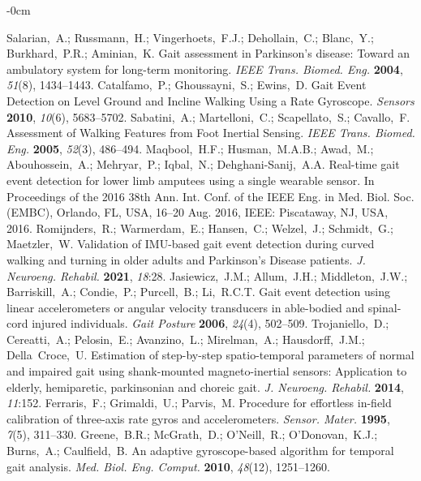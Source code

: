 \documentclass[sensors,article,submit,pdftex,moreauthors]{Definitions/mdpi}
\begin{document}
\begin{adjustwidth}{-\extralength}{0cm}
\begin{thebibliography}{999}
	Salarian,~A.; Russmann,~H.; Vingerhoets,~F.J.; Dehollain,~C.; Blanc,~Y.; Burkhard,~P.R.; Aminian,~K. Gait assessment in Parkinson's
	disease: Toward an ambulatory system for long-term monitoring. {\em IEEE Trans. Biomed. Eng.} {\bf 2004}, {\em 51}(8), 1434--1443. 
	Catalfamo,~P.; Ghoussayni,~S.; Ewins,~D. Gait Event Detection on Level Ground and Incline Walking Using a Rate Gyroscope. {\em Sensors} {\bf 2010}, {\em 10}(6), 5683--5702. 
	Sabatini,~A.; Martelloni,~C.; Scapellato,~S.; Cavallo,~F. Assessment of Walking Features from Foot Inertial Sensing. {\em IEEE Trans. Biomed. Eng.} {\bf 2005}, {\em 52}(3), 486--494.
	Maqbool,~H.F.; Husman,~M.A.B.; Awad,~M.; Abouhossein,~A.; Mehryar,~P.; Iqbal,~N.; Dehghani-Sanij,~A.A. Real-time gait event detection for lower limb amputees using a single wearable sensor. In Proceedings of the 2016 38th Ann. Int. Conf. of the IEEE Eng. in Med. Biol. Soc. (EMBC), Orlando, FL, USA, 16--20 Aug. 2016, IEEE: Piscataway, NJ, USA, 2016. 
	Romijnders,~R.; Warmerdam,~E.; Hansen,~C.; Welzel,~J.; Schmidt,~G.; Maetzler,~W. Validation of IMU-based gait event detection during curved walking and turning in older adults and Parkinson's Disease patients. {\em J. Neuroeng. Rehabil.} {\bf 2021}, {\em 18}:28.
	Jasiewicz,~J.M.; Allum,~J.H.; Middleton,~J.W.; Barriskill,~A.; Condie,~P.; Purcell,~B.; Li,~R.C.T. Gait event detection using linear accelerometers or angular velocity transducers in able-bodied and spinal-cord injured individuals. {\em Gait Posture} {\bf 2006}, {\em 24}(4), 502--509.
	Trojaniello,~D.; Cereatti,~A.; Pelosin,~E.; Avanzino,~L.; Mirelman,~A.; Hausdorff,~J.M.; Della~Croce,~U. Estimation of step-by-step spatio-temporal parameters of normal and impaired gait using shank-mounted magneto-inertial sensors: Application to elderly, hemiparetic, parkinsonian and choreic gait. {\em J. Neuroeng. Rehabil.} {\bf 2014}, {\em 11}:152.
	Ferraris,~F.; Grimaldi,~U.; Parvis,~M. Procedure for effortless in-field calibration of three-axis rate gyros and accelerometers. {\em Sensor. Mater.} {\bf 1995}, {\em 7}(5), 311--330.
	Greene,~B.R.; McGrath,~D.; O'Neill,~R.; O'Donovan,~K.J.; Burns,~A.; Caulfield,~B. An adaptive gyroscope-based algorithm for temporal gait analysis. {\em Med. Biol. Eng. Comput.} {\bf 2010}, {\em 48}(12), 1251--1260.

\end{thebibliography}
\end{adjustwidth}
\end{document}
